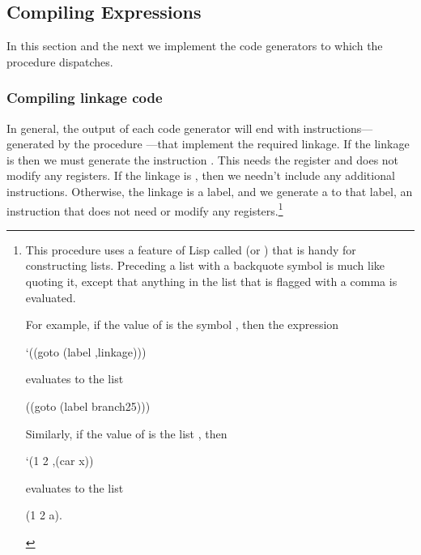 \subsection{Compiling Expressions}
\label{Section 5.5.2}

In this section and the next we implement the code generators to which the
 procedure dispatches.

\subsubsection*{Compiling linkage code}

In general, the output of each code generator will end with
instructions---generated by the procedure ---that
implement the required linkage.  If the linkage is  then we must
generate the instruction .  This needs the
 register and does not modify any registers.  If the linkage is
, then we needn't include any additional instructions.  Otherwise,
the linkage is a label, and we generate a  to that label, an
instruction that does not need or modify any registers.\footnote{This procedure
uses a feature of Lisp called  (or )
that is handy for constructing lists.  Preceding a list with a backquote symbol
is much like quoting it, except that anything in the list that is flagged with
a comma is evaluated.

For example, if the value of  is the symbol ,
then the expression

\begin{compactCodeBlock}
`((goto (label ,linkage)))
\end{compactCodeBlock}

\noindent
evaluates to the list

\begin{compactCodeBlock}
((goto (label branch25)))
\end{compactCodeBlock}

\noindent
Similarly, if the value of  is the list , then

\begin{compactCodeBlock}
`(1 2 ,(car x))
\end{compactCodeBlock}

\noindent
evaluates to the list

\begin{compactCodeBlock}
(1 2 a).
\end{compactCodeBlock}
}


